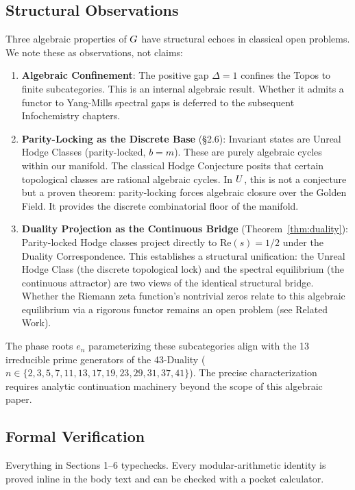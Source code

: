 \subsection{Structural Observations}

Three algebraic properties of $G$ have structural echoes in classical open problems. We note these as observations, not claims:

\begin{enumerate}
\item \textbf{Algebraic Confinement}: The positive gap $\Delta = 1$ confines the Topos to finite subcategories. This is an internal algebraic result. Whether it admits a functor to Yang-Mills spectral gaps is deferred to the subsequent Infochemistry chapters.
\item \textbf{Parity-Locking as the Discrete Base} (\S2.6): Invariant states are Unreal Hodge Classes (parity-locked, $b=m$). These are purely algebraic cycles within our manifold. The classical Hodge Conjecture posits that certain topological classes are rational algebraic cycles. In $U$, this is not a conjecture but a proven theorem: parity-locking forces algebraic closure over the Golden Field. It provides the discrete combinatorial floor of the manifold.
\item \textbf{Duality Projection as the Continuous Bridge} (Theorem~\ref{thm:duality}): Parity-locked Hodge classes project directly to $\mathrm{Re}(s) = 1/2$ under the Duality Correspondence. This establishes a structural unification: the Unreal Hodge Class (the discrete topological lock) and the spectral equilibrium (the continuous attractor) are two views of the identical structural bridge. Whether the Riemann zeta function's nontrivial zeros relate to this algebraic equilibrium via a rigorous functor remains an open problem (see Related Work).
\end{enumerate}

The phase roots $e_n$ parameterizing these subcategories align with the 13 irreducible prime generators of the 43-Duality ($n \in \{2,3,5,7,11,13,17,19,23,29,31,37,41\}$). The precise characterization requires analytic continuation machinery beyond the scope of this algebraic paper.

\subsection{Formal Verification}

Everything in Sections 1--6 typechecks. Every modular-arithmetic identity is proved inline in the body text and can be checked with a pocket calculator.

